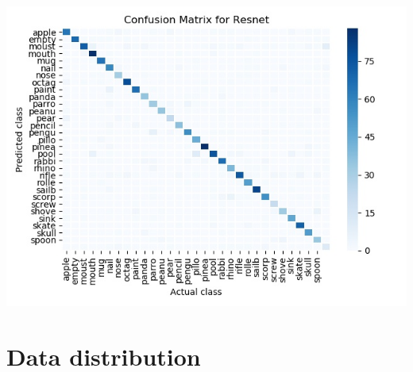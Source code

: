 \documentclass[reqno]{amsart}
\begin{document}
\includegraphics{Figures/resnet_confusionmat.jpg}

\newpage
\section{Data distribution}
\label{data}
\end{document}
